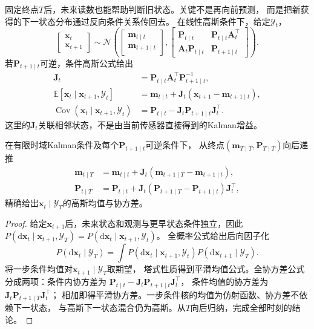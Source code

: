 固定终点$T$后，未来读数也能帮助判断旧状态。关键不是再向前预测，
而是把新获得的下一状态分布通过反向条件关系传回去。
在线性高斯条件下，给定$\mathcal Y_t$，
\[
 \begin{bmatrix}\bm x_t\\\bm x_{t+1}\end{bmatrix}
 \sim\mathcal N\left(
 \begin{bmatrix}\bm m_{t\mid t}\\\bm m_{t+1\mid t}\end{bmatrix},
 \begin{bmatrix}
  \bm P_{t\mid t}&\bm P_{t\mid t}\bm A_t^\top\\
  \bm A_t\bm P_{t\mid t}&\bm P_{t+1\mid t}
 \end{bmatrix}\right).
\]
若$\bm P_{t+1\mid t}$可逆，条件高斯公式给出
\begin{align}
 \bm J_t&=\bm P_{t\mid t}\bm A_t^\top\bm P_{t+1\mid t}^{-1},
    \label{eq:dynamical-rts-gain}\\
 \mathbb E[\bm x_t\mid\bm x_{t+1},\mathcal Y_t]
   &=\bm m_{t\mid t}+\bm J_t(\bm x_{t+1}-\bm m_{t+1\mid t}),
    \label{eq:dynamical-rts-one-step-conditional-mean}\\
 \operatorname{Cov}(\bm x_t\mid\bm x_{t+1},\mathcal Y_t)
   &=\bm P_{t\mid t}-\bm J_t\bm P_{t+1\mid t}\bm J_t^\top.
    \label{eq:dynamical-rts-one-step-conditional-covariance}
\end{align}
这里的$\bm J_t$关联相邻状态，不是由当前传感器直接得到的Kalman增益。

\begin{theorem}[有限时域RTS平滑]
 \label{thm:dynamical-rts-smoother}
 在有限时域Kalman条件及每个$\bm P_{t+1\mid t}$可逆条件下，
 从终点$(\bm m_{T\mid T},\bm P_{T\mid T})$向后递推
 \begin{align}
  \bm m_{t\mid T}
   &=\bm m_{t\mid t}+\bm J_t(\bm m_{t+1\mid T}-\bm m_{t+1\mid t}),
       \label{eq:dynamical-rts-smoothed-mean}\\
  \bm P_{t\mid T}
   &=\bm P_{t\mid t}
         +\bm J_t(\bm P_{t+1\mid T}-\bm P_{t+1\mid t})\bm J_t^\top,
       \label{eq:dynamical-rts-smoothed-covariance}
 \end{align}
 精确给出$\bm x_t\mid\mathcal Y_T$的高斯均值与协方差。
\end{theorem}
\begin{proof}
 给定$\bm x_{t+1}$后，未来状态和观测与更早状态条件独立，因此
 $P(\mathrm d\bm x_t\mid\bm x_{t+1},\mathcal Y_T)
   =P(\mathrm d\bm x_t\mid\bm x_{t+1},\mathcal Y_t)$。
 全概率公式给出后向因子化
 \begin{equation}
  P(\mathrm d\bm x_t\mid\mathcal Y_T)
   =\int P(\mathrm d\bm x_t\mid\bm x_{t+1},\mathcal Y_t)
                   P(\mathrm d\bm x_{t+1}\mid\mathcal Y_T).
  \label{eq:dynamical-rts-backward-factorization}
 \end{equation}
 将一步条件均值对$\bm x_{t+1}\mid\mathcal Y_T$取期望，
 塔式性质得到平滑均值公式。全协方差公式分成两项：条件内协方差为
 $\bm P_{t\mid t}-\bm J_t\bm P_{t+1\mid t}\bm J_t^\top$，
 条件均值的协方差为$\bm J_t\bm P_{t+1\mid T}\bm J_t^\top$；
 相加即得平滑协方差。一步条件核的均值为仿射函数、协方差不依赖下一状态，
 与高斯下一状态混合仍为高斯。从$T$向后归纳，完成全部时刻的结论。
\end{proof}

